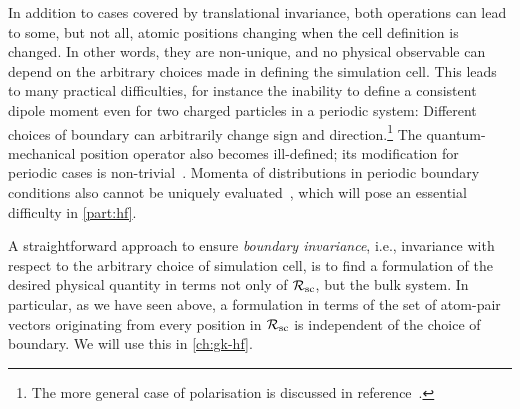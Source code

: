 In addition to cases covered by translational invariance, both operations can lead to some, but not all, atomic positions changing when the cell definition is changed.
In other words, they are non-unique, and no physical observable can depend on the arbitrary choices made in defining the simulation cell.
This leads to many practical difficulties, for instance the inability to define a consistent dipole moment even for two charged particles in a periodic system: Different choices of boundary can arbitrarily change sign and direction.\footnote{The more general case of polarisation is discussed in reference~\cite{rv2007t}.} The quantum-mechanical position operator also becomes ill-defined; its modification for periodic cases is non-trivial~\cite{amsb2019t}. Momenta of distributions in periodic boundary conditions also cannot be uniquely evaluated~\cite{fa2001t,rv2007t,mub2016t}, which will pose an essential difficulty in \cref{part:hf}.

A straightforward approach to ensure \emph{boundary invariance}, i.e., invariance with respect to the arbitrary choice of simulation cell, is to find a formulation of the desired physical quantity in terms not only of $\mathcal{R_{\text{sc}}}$, but the bulk system. In particular, as we have seen above, a formulation in terms of the set of atom-pair vectors originating from every position in $\mathcal{R_{\text{sc}}}$ is independent of the choice of boundary. We will use this in \cref{ch:gk-hf}.

